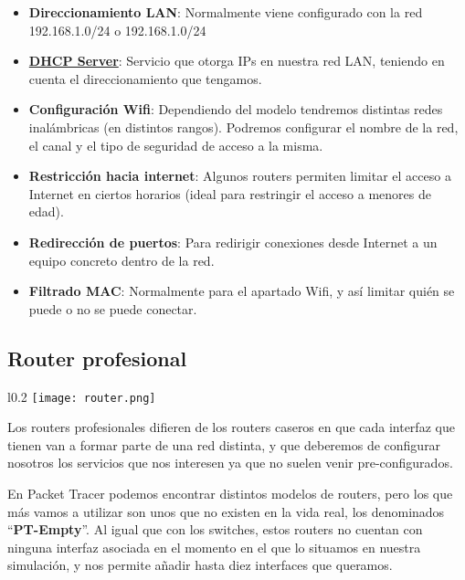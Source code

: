 \begin{itemize}
    \item \textbf{Direccionamiento LAN}: Normalmente viene configurado con la red 192.168.1.0/24 o 192.168.1.0/24

    \item \textbf{\hyperlink{dhcp}{DHCP Server}}: Servicio que otorga IPs en nuestra red LAN, teniendo en cuenta el direccionamiento que tengamos.

    \item \textbf{Configuración Wifi}: Dependiendo del modelo tendremos distintas redes inalámbricas (en distintos rangos). Podremos configurar el nombre de la red, el canal y el tipo de seguridad de acceso a la misma.

    \item \textbf{Restricción hacia internet}: Algunos routers permiten limitar el acceso a Internet en ciertos horarios (ideal para restringir el acceso a menores de edad).

    \item \textbf{Redirección de puertos}: Para redirigir conexiones desde Internet a un equipo concreto dentro de la red.

    \item \textbf{Filtrado MAC}: Normalmente para el apartado Wifi, y así limitar quién se puede o no se puede conectar.
\end{itemize}


\subsection{Router profesional}
\begin{wrapfigure}{l}{0.2\linewidth}
    \centering
    \vspace{-20pt}
    \texttt{[image: router.png]}
    \vspace{-32pt}
\end{wrapfigure}

Los routers profesionales difieren de los routers caseros en que cada interfaz que tienen van a formar parte de una red distinta, y que deberemos de configurar nosotros los servicios que nos interesen ya que no suelen venir pre-configurados.

En Packet Tracer podemos encontrar distintos modelos de routers, pero los que más vamos a utilizar son unos que no existen en la vida real, los denominados “\textbf{PT-Empty}”. Al igual que con los switches, estos routers no cuentan con ninguna interfaz asociada en el momento en el que lo situamos en nuestra simulación, y nos permite añadir hasta diez interfaces que queramos.

